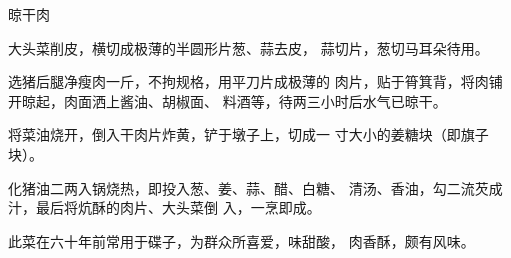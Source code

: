\begin{recipe}{晾干肉}

\ingredients



\cooking

\step 大头菜削皮，横切成极薄的半圆形片葱、蒜去皮， 蒜切片，葱切马耳朵待用。

选猪后腿净瘦肉一斤，不拘规格，用平刀片成极薄的 肉片，贴于筲箕背，将肉铺开晾起，肉面洒上酱油、胡椒面、 料酒等，待两三小时后水气已晾干。

\step 	将菜油烧开，倒入干肉片炸黄，铲于墩子上，切成一 寸大小的姜糖块（即旗子块）。

\step 	化猪油二两入锅烧热，即投入葱、姜、蒜、醋、白糖、 清汤、香油，勾二流芡成汁，最后将炕酥的肉片、大头菜倒 入，一烹即成。

\notes

此菜在六十年前常用于碟子，为群众所喜爱，味甜酸， 肉香酥，颇有风味。

\end{recipe}

